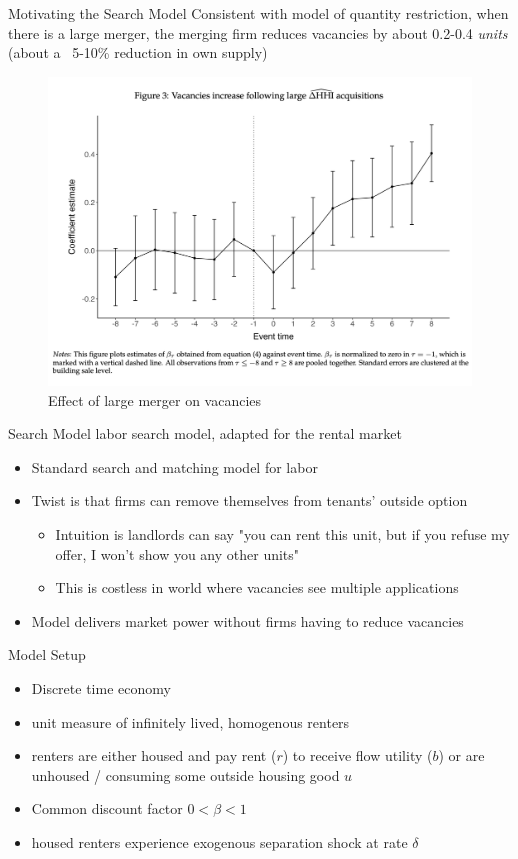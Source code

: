 \documentclass[10pt, xcolor=dvipsnames]{beamer}
\begin{document}
\begin{frame}{Motivating the Search Model}
Consistent with model of quantity restriction, when there is a large merger, the merging firm reduces vacancies by about 0.2-0.4 \textit{units} (about a ~5-10\% reduction in own supply)
    \begin{figure}
        \centering
        \includegraphics[width=0.5\linewidth]{figs/fern-jmp-vacancy.png}
        \caption{Effect of large merger on vacancies}
        \label{fig:fern-prices}
    \end{figure}
\end{frame}


    

\begin{frame}{Search Model}
\cite{jarosh-search-2024} labor search model, adapted for the rental market 
    \begin{itemize}
        \item Standard search and matching model for labor
        \item Twist is that firms can remove themselves from tenants' outside option
        \begin{itemize}
            \item Intuition is landlords can say "you can rent this unit, but if you refuse my offer, I won't show you any other units"
            \item This is costless in world where vacancies see multiple applications
        \end{itemize}
        \item Model delivers market power without firms having to reduce vacancies
    \end{itemize}
\end{frame}

\begin{frame}{Model Setup}
    \begin{itemize}
    \item Discrete time economy
    \item unit measure of infinitely lived, homogenous renters
    \item renters are either housed and pay rent ($r$) to receive flow utility ($b$) or are unhoused / consuming some outside housing good $u$
    \item Common discount factor $0 < \beta < 1$
    \item housed renters experience exogenous separation shock at rate $\delta$
\end{itemize}
\end{frame}
\end{document}
